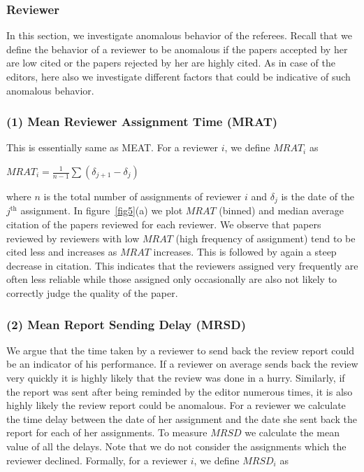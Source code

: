 \noindent
\subsubsection{Reviewer}
\label{reviewer}

In this section, we investigate anomalous behavior of the referees. Recall that we define the behavior of a reviewer to be anomalous if the papers accepted by her are low cited or the papers rejected by her are highly cited. As in case of the editors, here also we investigate different factors that could be indicative of such anomalous behavior.  

\subsubsection*{(1) Mean Reviewer Assignment Time (MRAT)}

This is essentially same as MEAT. For a reviewer $i$, we define $MRAT_{i}$ as
\begin{center}
$MRAT_{i}=\frac{1}{n-1}\sum (\delta_{j+1} - \delta_{j})$
\end{center}
\noindent where $n$ is the total number of assignments of reviewer $i$ and $\delta_{j}$ is the date of the $j^\textrm{th}$ assignment. In figure~\ref{fig5}(a) we plot $MRAT$ (binned) and median average citation of the papers reviewed for each reviewer. We observe that papers reviewed by reviewers with low $MRAT$ (high frequency of assignment) tend to be cited less and increases as $MRAT$ increases. This is followed by again a steep decrease in citation. This indicates that the reviewers assigned very frequently are often less reliable while those assigned only occasionally are also not likely to correctly judge the quality of the paper.  

\subsubsection*{(2) Mean Report Sending Delay (MRSD)}

We argue that the time taken by a reviewer to send back the review report could be an indicator of his performance. If a reviewer on average sends back the review very quickly it is highly likely that the review was done in a hurry. Similarly, if the report was sent after being reminded by the editor numerous times, it is also highly likely the review report could be anomalous. For a reviewer we calculate the time delay between the date of her assignment and the date she sent back the report for each of her assignments. To measure $MRSD$ we calculate the mean value of all the delays. Note that we do not consider the assignments which the reviewer declined. Formally, for a reviewer $i$, we define $MRSD_{i}$ as 

